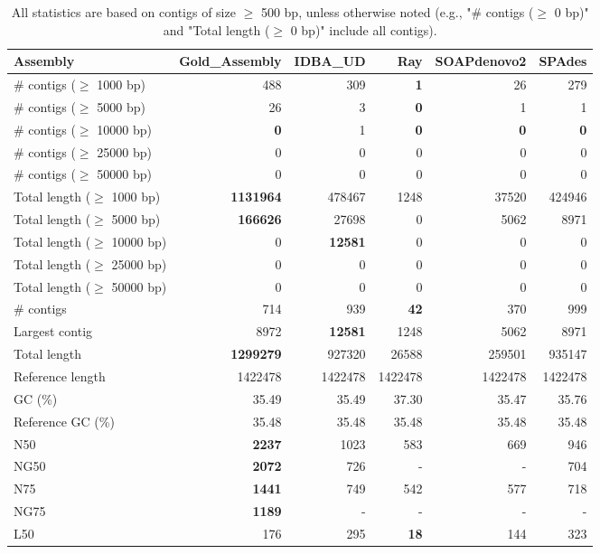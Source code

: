 \documentclass[12pt,a4paper]{article}
\begin{document}
\begin{table}[ht]
\begin{center}
\caption{All statistics are based on contigs of size $\geq$ 500 bp, unless otherwise noted (e.g., "\# contigs ($\geq$ 0 bp)" and "Total length ($\geq$ 0 bp)" include all contigs).}
\begin{tabular}{|l*{5}{|r}|}
\hline
Assembly & Gold\_Assembly & IDBA\_UD & Ray & SOAPdenovo2 & SPAdes \\ \hline
\# contigs ($\geq$ 1000 bp) & 488 & 309 & {\bf 1} & 26 & 279 \\ \hline
\# contigs ($\geq$ 5000 bp) & 26 & 3 & {\bf 0} & 1 & 1 \\ \hline
\# contigs ($\geq$ 10000 bp) & {\bf 0} & 1 & {\bf 0} & {\bf 0} & {\bf 0} \\ \hline
\# contigs ($\geq$ 25000 bp) & 0 & 0 & 0 & 0 & 0 \\ \hline
\# contigs ($\geq$ 50000 bp) & 0 & 0 & 0 & 0 & 0 \\ \hline
Total length ($\geq$ 1000 bp) & {\bf 1131964} & 478467 & 1248 & 37520 & 424946 \\ \hline
Total length ($\geq$ 5000 bp) & {\bf 166626} & 27698 & 0 & 5062 & 8971 \\ \hline
Total length ($\geq$ 10000 bp) & 0 & {\bf 12581} & 0 & 0 & 0 \\ \hline
Total length ($\geq$ 25000 bp) & 0 & 0 & 0 & 0 & 0 \\ \hline
Total length ($\geq$ 50000 bp) & 0 & 0 & 0 & 0 & 0 \\ \hline
\# contigs & 714 & 939 & {\bf 42} & 370 & 999 \\ \hline
Largest contig & 8972 & {\bf 12581} & 1248 & 5062 & 8971 \\ \hline
Total length & {\bf 1299279} & 927320 & 26588 & 259501 & 935147 \\ \hline
Reference length & 1422478 & 1422478 & 1422478 & 1422478 & 1422478 \\ \hline
GC (\%) & 35.49 & 35.49 & 37.30 & 35.47 & 35.76 \\ \hline
Reference GC (\%) & 35.48 & 35.48 & 35.48 & 35.48 & 35.48 \\ \hline
N50 & {\bf 2237} & 1023 & 583 & 669 & 946 \\ \hline
NG50 & {\bf 2072} & 726 & - & - & 704 \\ \hline
N75 & {\bf 1441} & 749 & 542 & 577 & 718 \\ \hline
NG75 & {\bf 1189} & - & - & - & - \\ \hline
L50 & 176 & 295 & {\bf 18} & 144 & 323 \\ \hline

\end{tabular}
\end{center}
\end{table}
\end{document}
